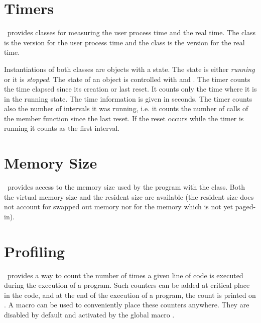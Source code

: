 
\section{Timers}

\cgal\ provides classes for measuring the user process time and the real time.
The class  is the version for the user process time and
the class  is the version for the real time.

Instantiations of both classes are objects with a state. The state is
either {\em running\/} or it is {\em stopped}. The state of an object
 is controlled
with  and  . The timer counts the
time elapsed since its creation or last reset. It counts only the time
where it is in the running state. The time information is given in seconds.
The timer counts also the number of intervals it was running, i.e. it 
counts the number of calls of the  member function since the 
last reset. If the reset occurs while the timer is running it counts as the
first interval.

\section{Memory Size}

\cgal\ provides access to the memory size used by the program with the
 class.  Both the virtual memory size and the
resident size are available (the resident size does not account for
swapped out memory nor for the memory which is not yet paged-in).

\section{Profiling}

\cgal\ provides a way to count the number of times a given line of code
is executed during the execution of a program.  Such
 counters can be added at critical place in the
code, and at the end of the execution of a program, the count is printed on
.  A macro  can be used to conveniently place
these counters anywhere.  They are disabled by default and activated by the
global macro .


